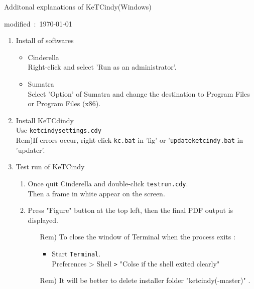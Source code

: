 \documentclass{article}
\begin{document}
\begin{center}
Additonal explanations of KeTCindy(Windows)
\end{center}

\hfill modified\ :\ \today

\begin{enumerate}[\bf\large 1.]
\item Install of softwares

\begin{itemize}
\item Cinderella\\
\hspace*{5mm}Right-click and select 'Run as an administrator'.
\item Sumatra\\
\hspace*{5mm}Select 'Option' of Sumatra and change the destination to Program Files or Program Files (x86).
 \end{itemize}


\item Install KeTCdindy\\
\hspace*{5mm}Use \verb|ketcindysettings.cdy|\\
\hspace*{10mm}Rem)If errors occur, right-click  \verb|kc.bat| in 'fig' or  '\verb|updateketcindy.bat| in 'updater'.

\item Test run of KeTCindy
 \begin{enumerate}[(1)]
  \item Once quit Cinderella and double-click \verb|testrun.cdy|.\\
  \hspace*{10mm}Then a frame in white appear on the screen.  
  \item Press "Figure" button at the top left, then the final PDF output is displayed. 
    \begin{itemize}
    \item[Rem)]To close the window of Terminal when the process exits :
      \begin{itemize}
      \item Start \verb|Terminal|.\\
      \hspace*{10mm}Preferences > Shell \verb|>| "Colse if the shell exited clearly"
      \end{itemize}
    \item[Rem)]It will be better to delete installer folder "ketcindy(-master)" .
    \end{itemize} 
  \end{enumerate}


\end{enumerate}
\end{document}
